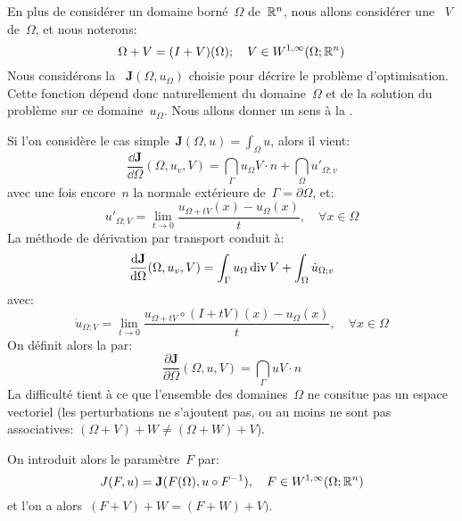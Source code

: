 En plus de considérer un domaine borné~$\Omega$ de~$\mathbb R^n$, nous allons considérer une ~$V$ de~$\Omega$, et nous noterons:
\begin{equation} \Omega + V = (I+V)(\Omega);\quad V\in W^{1,\infty}(\Omega;\mathbb R^n) \end{equation}
\medskipvm
Nous considérons la ~${\mathbf J}(\Omega, u_\Omega)$ choisie pour décrire le problème d'optimisation. Cette fonction dépend donc naturellement du domaine~$\Omega$ et de la solution du problème sur ce domaine~$u_\Omega$. Nous allons donner un sens à la .

\medskip
Si l'on considère le cas simple~${\mathbf J}(\Omega,u)=\int_\Omega u$, alors il vient:
\begin{equation}
\dfrac{\dd{\mathbf J}}{\dd\Omega}(\Omega, u_v,V)=\dint_\Gamma u_\Omega V\cdot n + \dint_\Omega u'_{\Omega;v}
\end{equation}
avec une fois encore~$n$ la normale extérieure de~$\Gamma=\partial\Omega$, et:
\begin{equation}
u'_{\Omega;V}=\lim_{t\rightarrow0} \dfrac{u_{\Omega+tV}(x)-u_\Omega(x)}t, \quad\forall x\in\Omega
\end{equation}
La méthode de dérivation par transport conduit à:
\begin{equation}
\dfrac{\text{d}{\mathbf J}}{\text{d}\Omega}(\Omega, u_v,V)=\displaystyle\int_\Gamma u_\Omega \operatorname{div} V + \displaystyle\int_\Omega \dot{u}_{\Omega;v}
\end{equation}
avec:
\begin{equation}
\dot{u}_{\Omega;V}=\lim_{t\rightarrow0} \dfrac{u_{\Omega+tV}\circ (I+tV)(x)-u_\Omega(x)}t,\quad \forall x\in\Omega
\end{equation}
On définit alors la 
par:
\begin{equation}
\dfrac{\partial{\mathbf J}}{\partial\Omega}(\Omega, u,V) = \dint_\Gamma u V\cdot n
\end{equation}
La difficulté tient à ce que l'ensemble des domaines~$\Omega$ ne consitue pas un espace vectoriel (les perturbations ne s'ajoutent pas, ou au moins ne sont pas associatives:
$(\Omega+V)+W\ne(\Omega+W)+V$).

\medskip
{} On introduit alors le paramètre~$F$ par:
\begin{equation}
J(F,u)={\mathbf J}(F(\Omega),u\circ F^{-1}),\quad F\in W^{1,\infty}(\Omega;\mathbb R^n)
\end{equation}
et l'on a alors~$(F+V)+W=(F+W)+V)$.

